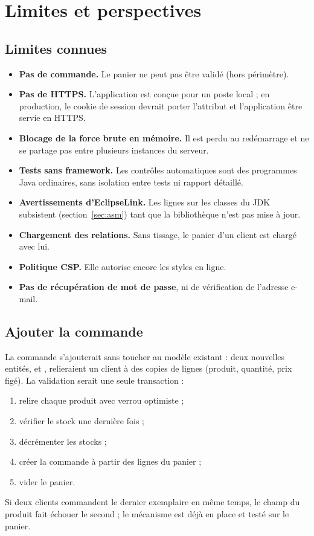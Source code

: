 \chapter{Limites et perspectives}\label{chap:perspectives}

\section{Limites connues}
\begin{itemize}
  \item \textbf{Pas de commande.} Le panier ne peut pas être validé (hors périmètre).
  \item \textbf{Pas de HTTPS.} L'application est conçue pour un poste local ; en production, le cookie de session devrait
        porter l'attribut  et l'application être servie en HTTPS.
  \item \textbf{Blocage de la force brute en mémoire.} Il est perdu au redémarrage et ne se partage pas entre plusieurs
        instances du serveur.
  \item \textbf{Tests sans framework.} Les contrôles automatiques sont des programmes Java ordinaires, sans isolation
        entre tests ni rapport détaillé.
  \item \textbf{Avertissements d'EclipseLink.} Les lignes \code{[EL Severe]} sur les classes du JDK subsistent
        (section~\ref{sec:asm}) tant que la bibliothèque n'est pas mise à jour.
  \item \textbf{Chargement des relations.} Sans tissage, le panier d'un client est chargé avec lui.
  \item \textbf{Politique CSP.} Elle autorise encore les styles en ligne.
  \item \textbf{Pas de récupération de mot de passe}, ni de vérification de l'adresse e-mail.
\end{itemize}

\section{Ajouter la commande}
La commande s'ajouterait sans toucher au modèle existant : deux nouvelles entités,  et , relieraient
un client à des copies de lignes (produit, quantité, prix figé). La validation serait une seule transaction :
\begin{enumerate}
  \item relire chaque produit avec verrou optimiste ;
  \item vérifier le stock une dernière fois ;
  \item décrémenter les stocks ;
  \item créer la commande à partir des lignes du panier ;
  \item vider le panier.
\end{enumerate}
Si deux clients commandent le dernier exemplaire en même temps, le champ  du produit fait échouer le second ; le
mécanisme est déjà en place et testé sur le panier.

